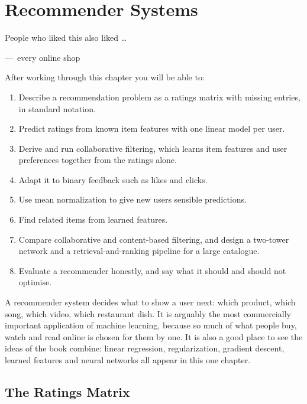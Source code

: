 
\chapter{Recommender Systems}
\label{ch:ch15}

\epigraph{People who liked this also liked \dots}{---\ every online shop}

\begin{chapterlearning}
After working through this chapter you will be able to:
\begin{enumerate}
  \item Describe a recommendation problem as a ratings matrix with missing
        entries, in standard notation.
  \item Predict ratings from known item features with one linear model per user.
  \item Derive and run collaborative filtering, which learns item features and
        user preferences together from the ratings alone.
  \item Adapt it to binary feedback such as likes and clicks.
  \item Use mean normalization to give new users sensible predictions.
  \item Find related items from learned features.
  \item Compare collaborative and content-based filtering, and design a
        two-tower network and a retrieval-and-ranking pipeline for a large
        catalogue.
  \item Evaluate a recommender honestly, and say what it should and should not
        optimise.
\end{enumerate}
\end{chapterlearning}

A recommender system decides what to show a user next: which product, which
song, which video, which restaurant dish. It is arguably the most commercially
important application of machine learning, because so much of what people buy,
watch and read online is chosen for them by one. It is also a good place to see
the ideas of the book combine: linear regression, regularization, gradient
descent, learned features and neural networks all appear in this one chapter.

\section{The Ratings Matrix}
\label{sec:ratings}

